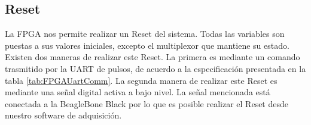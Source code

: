 	\subsection{Reset}
		La FPGA nos permite realizar un Reset del sistema. Todas las variables son puestas a sus valores iniciales, excepto el multiplexor que mantiene
		su estado. Existen dos maneras de realizar este Reset. La primera es mediante un comando trasmitido por la UART de  pulsos, de acuerdo a la
		especificación presentada en la tabla \ref{tab:FPGAUartComm}. La segunda manera de realizar este Reset es mediante una señal digital activa a
		bajo nivel. La señal mencionada está conectada a la BeagleBone Black por lo que es posible realizar el Reset desde nuestro software de adquisición. 
